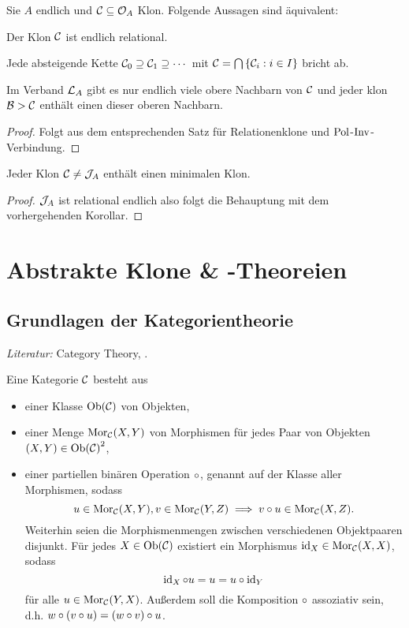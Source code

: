 \documentclass{book}
\begin{document}
\begin{corollary}
    Sie $A$ endlich und $\mathcal{C}\subseteq \mathcal{O}_A$ Klon. Folgende Aussagen sind äquivalent:
    \begin{statements}
            \item Der Klon $\mathcal{C}$ ist endlich relational.
            \item Jede absteigende Kette $\mathcal{C}_0\supseteq \mathcal{C}_1\supseteq \cdots$ mit $\mathcal{C}=\bigcap\left\{\mathcal{C}_i:i\in I\right\}$ bricht ab.
            \item Im Verband $\mathcal{L}_A$ gibt es nur endlich viele obere Nachbarn von $\mathcal{C}$ und jeder klon $\mathcal{B}>\mathcal{C}$ enthält einen dieser oberen Nachbarn.
    \end{statements}
\end{corollary}

\begin{proof}
    Folgt aus dem entsprechenden Satz für Relationenklone und $\mathop\mathrm{Pol}$-$\mathop\mathrm{Inv}$-Verbindung.
\end{proof}

\begin{corollary}
    Jeder Klon $\mathcal{C}\neq\mathcal{J}_A$ enthält einen minimalen Klon.
\end{corollary}

\begin{proof}
    $\mathcal{J}_A$ ist relational endlich also folgt die Behauptung mit dem vorhergehenden Korollar.
\end{proof}

\chapter{Abstrakte Klone \& -Theoreien}

\section{Grundlagen der Kategorientheorie}

\emph{Literatur:} Category Theory, .

\begin{definition}[Kategorie]
    Eine Kategorie $\mathcal{C}$ besteht aus
    \begin{itemize}
            \item einer Klasse $\mathop\mathrm{Ob}(\mathcal{C})$ von Objekten,
            \item einer Menge $\mathop\mathrm{Mor}\nolimits_{\mathcal{C}}(X,Y)$ von Morphismen für jedes Paar von Objekten $(X,Y)\in{\mathop\mathrm{Ob}(\mathcal{C})}^2$,
            \item einer partiellen binären Operation $\circ$, genannt  auf der Klasse aller Morphismen, sodass
        $$
        u\in\mathop\mathrm{Mor}\nolimits_{\mathcal{C}}(X,Y),v\in\mathop\mathrm{Mor}\nolimits_{\mathcal{C}}(Y,Z)\implies v\circ u\in\mathop\mathrm{Mor}\nolimits_{\mathcal{C}}(X,Z).
        $$
        Weiterhin seien die Morphismenmengen zwischen verschiedenen Objektpaaren disjunkt.
        Für jedes $X\in\mathop\mathrm{Ob}(\mathcal{C})$ existiert ein Morphismus $\mathop\mathrm{id}\nolimits_X\in\mathop\mathrm{Mor}\nolimits_{\mathcal{C}}(X,X)$, sodass
        $$
        \mathop\mathrm{id}\nolimits_X\circ u=u=u\circ \mathop\mathrm{id}\nolimits_Y
        $$
        für alle $u\in\mathop\mathrm{Mor}\nolimits_{\mathcal{C}}(Y,X)$.
        Außerdem soll die Komposition $\circ$ assoziativ sein, d.h. $w\circ(v\circ u)=(w\circ v)\circ u$.
    \end{itemize}
\end{definition}
\end{document}
